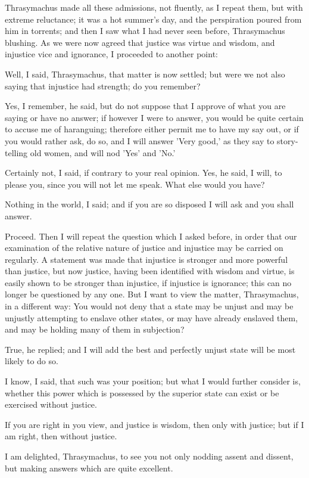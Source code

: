 Thrasymachus made all these admissions, not fluently, as I repeat them, but with extreme reluctance; it was a hot summer's day, and the perspiration poured from him in torrents; and then I saw what I had never seen before, Thrasymachus blushing. As we were now agreed that justice was virtue and wisdom, and injustice vice and ignorance, I proceeded to another point:

Well, I said, Thrasymachus, that matter is now settled; but were we not also saying that injustice had strength; do you remember?

Yes, I remember, he said, but do not suppose that I approve of what you are saying or have no answer; if however I were to answer, you would be quite certain to accuse me of haranguing; therefore either permit me to have my say out, or if you would rather ask, do so, and I will answer 'Very good,' as they say to story-telling old women, and will nod 'Yes' and 'No.'

Certainly not, I said, if contrary to your real opinion.
Yes, he said, I will, to please you, since you will not let me speak. What else would you have?

Nothing in the world, I said; and if you are so disposed I will ask and you shall answer.

Proceed.
Then I will repeat the question which I asked before, in order that our examination of the relative nature of justice and injustice may be carried on regularly. A statement was made that injustice is stronger and more powerful than justice, but now justice, having been identified with wisdom and virtue, is easily shown to be stronger than injustice, if injustice is ignorance; this can no longer be questioned by any one. But I want to view the matter, Thrasymachus, in a different way: You would not deny that a state may be unjust and may be unjustly attempting to enslave other states, or may have already enslaved them, and may be holding many of them in subjection?

True, he replied; and I will add the best and perfectly unjust state will be most likely to do so.

I know, I said, that such was your position; but what I would further consider is, whether this power which is possessed by the superior state can exist or be exercised without justice.

If you are right in you view, and justice is wisdom, then only with justice; but if I am right, then without justice.

I am delighted, Thrasymachus, to see you not only nodding assent and dissent, but making answers which are quite excellent.

